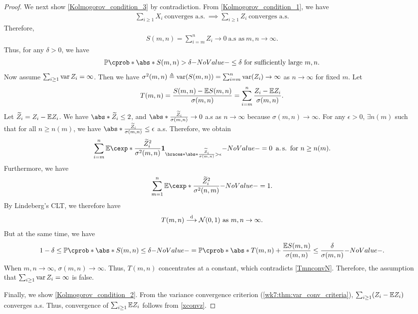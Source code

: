 \documentclass[12pt]{article}
\begin{document}
\begin{proof}
We next show \cref{Kolmogorov_condition_3} by contradiction. From \cref{Kolmogorov_condition_1}, we have
\begin{align}\label{xconvz}
\sum_{i \geq 1}X_i \ \text{converges a.s.}\ \implies \sum_{i \geq 1}Z_i \ \text{converges a.s.}
\end{align}
Therefore, 
\begin{align*}
S(m,n) = \sum_{i=m}^n Z_i \to 0 \ \text{a.s as}\ m, n \to \infty. 
\end{align*}
Thus, for any $\delta > 0$, we have 
\begin{align} \label{Kolmogorov_intmd_ineq}
\P(\abs*{S(m,n)} > \delta) \leq \delta \ \text{for sufficiently large}\ m, n.
\end{align} 
Now assume $\sum_{i \geq 1} \operatorname{var} Z_i = \infty$. Then we have $\sigma^2(m,n) \triangleq \operatorname{var}(S(m,n)) = \sum_{i=m}^n \operatorname{var}(Z_i) \to \infty$ as $n \to \infty$ for fixed $m$. Let
\begin{align*}
T(m,n) 
= \frac{S(m,n) - \E S(m,n)}{\sigma(m,n)}
= \sum_{i=m}^n \frac{Z_i - \E Z_i}{\sigma(m,n)}.
\end{align*}
Let $\widetilde{Z}_i = Z_i - \E Z_i$. We have $\abs*{\widetilde{Z}_i} \leq 2$, and $\abs*{\frac{\widetilde{Z}_i}{\sigma(m,n)}} \to 0$ a.s as $n \to \infty$ because $\sigma(m,n) \to \infty$. For any $\epsilon>0$, $\exists n(m)$ such that for all $n \geq n(m)$, we have $\abs*{\frac{\widetilde{Z}_i}{\sigma(m,n)}} \leq \epsilon$ a.s. Therefore, we obtain
\begin{align*}
\sum_{i=m}^n \E[\frac{\widetilde{Z}_i^2}{\sigma^2(m,n)} \indicator{\abs*{\frac{\widetilde{Z}_i}{\sigma(m,n)}} > \epsilon}] = 0\ \as \text{ for}\ n \geq n(m).
\end{align*}
Furthermore, we have 
\begin{align*}
\sum_{m=1}^n \E[\frac{\widetilde{Z}_i^2}{\sigma^2(n,m)}] = 1.
\end{align*}
By Lindeberg's CLT, we therefore have
\begin{align}
T(m,n) \stackrel{\mathrm{d}}{\longrightarrow} \mathcal{N} (0,1) \ \text{as}\ m,n \to \infty.\label{TmnconvN}
\end{align}
But at the same time, we have
\begin{align*}
1-\delta \leq \P(\abs*{S(m,n)} \leq \delta) = \P(\abs*{T(m,n) + \frac{\E S(m,n)}{\sigma(m,n)}} \leq \frac{\delta}{\sigma(m,n)}).
\end{align*}
When $m, n \to \infty$, $\sigma(m,n) \to \infty$. Thus, $T(m,n)$ concentrates at a constant, which contradicts \cref{TmnconvN}. Therefore, the assumption that $\sum_{i \geq 1} \operatorname{var} Z_i = \infty$ is false.

Finally, we show \cref{Kolmogorov_condition_2}. From the variance convergence criterion (\cref{wk7:thm:var_conv_criteria}), $\sum_{i \geq 1}(Z_i - \E Z_i)$ converges a.s. Thus, convergence of $\sum_{i \geq 1} \E Z_i$ follows from \cref{xconvz}.
\end{proof}
\end{document}
